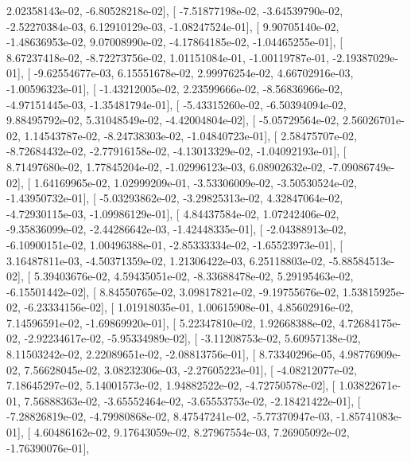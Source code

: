 \documentclass{article}
\begin{document}
          2.02358143e-02,  -6.80528218e-02],
       [ -7.51877198e-02,  -3.64539790e-02,  -2.52270384e-03,
          6.12910129e-03,  -1.08247524e-01],
       [  9.90705140e-02,  -1.48636953e-02,   9.07008990e-02,
         -4.17864185e-02,  -1.04465255e-01],
       [  8.67237418e-02,  -8.72273756e-02,   1.01151084e-01,
         -1.00119787e-01,  -2.19387029e-01],
       [ -9.62554677e-03,   6.15551678e-02,   2.99976254e-02,
          4.66702916e-03,  -1.00596323e-01],
       [ -1.43212005e-02,   2.23599666e-02,  -8.56836966e-02,
         -4.97151445e-03,  -1.35481794e-01],
       [ -5.43315260e-02,  -6.50394094e-02,   9.88495792e-02,
          5.31048549e-02,  -4.42004804e-02],
       [ -5.05729564e-02,   2.56026701e-02,   1.14543787e-02,
         -8.24738303e-02,  -1.04840723e-01],
       [  2.58475707e-02,  -8.72684432e-02,  -2.77916158e-02,
         -4.13013329e-02,  -1.04092193e-01],
       [  8.71497680e-02,   1.77845204e-02,  -1.02996123e-03,
          6.08902632e-02,  -7.09086749e-02],
       [  1.64169965e-02,   1.02999209e-01,  -3.53306009e-02,
         -3.50530524e-02,  -1.43950732e-01],
       [ -5.03293862e-02,  -3.29825313e-02,   4.32847064e-02,
         -4.72930115e-03,  -1.09986129e-01],
       [  4.84437584e-02,   1.07242406e-02,  -9.35836099e-02,
         -2.44286642e-03,  -1.42448335e-01],
       [ -2.04388913e-02,  -6.10900151e-02,   1.00496388e-01,
         -2.85333334e-02,  -1.65523973e-01],
       [  3.16487811e-03,  -4.50371359e-02,   1.21306422e-03,
          6.25118803e-02,  -5.88584513e-02],
       [  5.39403676e-02,   4.59435051e-02,  -8.33688478e-02,
          5.29195463e-02,  -6.15501442e-02],
       [  8.84550765e-02,   3.09817821e-02,  -9.19755676e-02,
          1.53815925e-02,  -6.23334156e-02],
       [  1.01918035e-01,   1.00615908e-01,   4.85602916e-02,
          7.14596591e-02,  -1.69869920e-01],
       [  5.22347810e-02,   1.92668388e-02,   4.72684175e-02,
         -2.92234617e-02,  -5.95334989e-02],
       [ -3.11208753e-02,   5.60957138e-02,   8.11503242e-02,
          2.22089651e-02,  -2.08813756e-01],
       [  8.73340296e-05,   4.98776909e-02,   7.56628045e-02,
          3.08232306e-03,  -2.27605223e-01],
       [ -4.08212077e-02,   7.18645297e-02,   5.14001573e-02,
          1.94882522e-02,  -4.72750578e-02],
       [  1.03822671e-01,   7.56888363e-02,  -3.65552464e-02,
         -3.65553753e-02,  -2.18421422e-01],
       [ -7.28826819e-02,  -4.79980868e-02,   8.47547241e-02,
         -5.77370947e-03,  -1.85741083e-01],
       [  4.60486162e-02,   9.17643059e-02,   8.27967554e-03,
          7.26905092e-02,  -1.76390076e-01],
\end{document}
